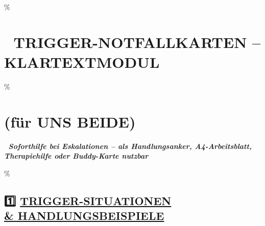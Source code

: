 \hypertarget{trigger-notfallkarten-klartextmodul}{\%
\section{\texorpdfstring{\textbf{🚨 TRIGGER-NOTFALLKARTEN -- KLARTEXTMODUL} }{🚨 TRIGGER-NOTFALLKARTEN -- KLARTEXTMODUL }}\label{trigger-notfallkarten-klartextmodul}}

\hypertarget{fuxfcr-uns-beide}{\%
\section{\texorpdfstring{\textbf{(für UNS BEIDE)}}{(für UNS BEIDE)}}\label{fuxfcr-uns-beide}}

🧩 \emph{\textbf{Soforthilfe bei Eskalationen -- als Handlungsanker, A4-Arbeitsblatt, Therapiehilfe oder Buddy-Karte nutzbar}}

\hypertarget{trigger-situationen-handlungsbeispiele}{\%
\subsection{\texorpdfstring{\textbf{1️⃣ \ul{TRIGGER-SITUATIONEN \\& HANDLUNGSBEISPIELE}}}{1️⃣ TRIGGER-SITUATIONEN \\& HANDLUNGSBEISPIELE}}\label{trigger-situationen-handlungsbeispiele}}

